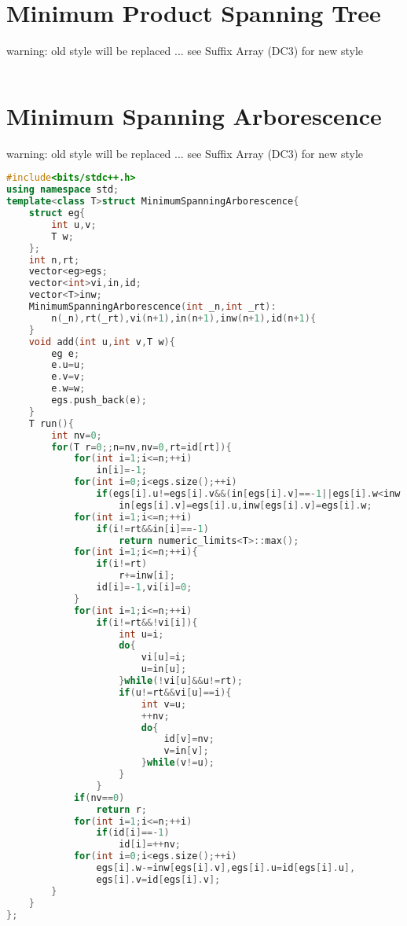 \documentclass{book}
\begin{document}
\section{Minimum Product Spanning Tree}
warning: old style will be replaced ... see Suffix Array (DC3) for new style\begin{lstlisting}[language=C++,title={Minimum Product Spanning Tree.hpp (0 bytes, 0 lines)}]
\end{lstlisting}
\section{Minimum Spanning Arborescence}
warning: old style will be replaced ... see Suffix Array (DC3) for new style\begin{lstlisting}[language=C++,title={Minimum Spanning Arborescence.hpp (1933 bytes, 64 lines)}]
#include<bits/stdc++.h>
using namespace std;
template<class T>struct MinimumSpanningArborescence{
    struct eg{
        int u,v;
        T w;
    };
    int n,rt;
    vector<eg>egs;
    vector<int>vi,in,id;
    vector<T>inw;
    MinimumSpanningArborescence(int _n,int _rt):
        n(_n),rt(_rt),vi(n+1),in(n+1),inw(n+1),id(n+1){
    }
    void add(int u,int v,T w){
        eg e;
        e.u=u;
        e.v=v;
        e.w=w;
        egs.push_back(e);
    }
    T run(){
        int nv=0;
        for(T r=0;;n=nv,nv=0,rt=id[rt]){
            for(int i=1;i<=n;++i)
                in[i]=-1;
            for(int i=0;i<egs.size();++i)
                if(egs[i].u!=egs[i].v&&(in[egs[i].v]==-1||egs[i].w<inw[egs[i].v]))
                    in[egs[i].v]=egs[i].u,inw[egs[i].v]=egs[i].w;
            for(int i=1;i<=n;++i)
                if(i!=rt&&in[i]==-1)
                    return numeric_limits<T>::max();
            for(int i=1;i<=n;++i){
                if(i!=rt)
                    r+=inw[i];
                id[i]=-1,vi[i]=0;
            }
            for(int i=1;i<=n;++i)
                if(i!=rt&&!vi[i]){
                    int u=i;
                    do{
                        vi[u]=i;
                        u=in[u];
                    }while(!vi[u]&&u!=rt);
                    if(u!=rt&&vi[u]==i){
                        int v=u;
                        ++nv;
                        do{
                            id[v]=nv;
                            v=in[v];
                        }while(v!=u);
                    }
                }
            if(nv==0)
                return r;
            for(int i=1;i<=n;++i)
                if(id[i]==-1)
                    id[i]=++nv;
            for(int i=0;i<egs.size();++i)
                egs[i].w-=inw[egs[i].v],egs[i].u=id[egs[i].u],
                egs[i].v=id[egs[i].v];
        }
    }
};
\end{lstlisting}
\end{document}
